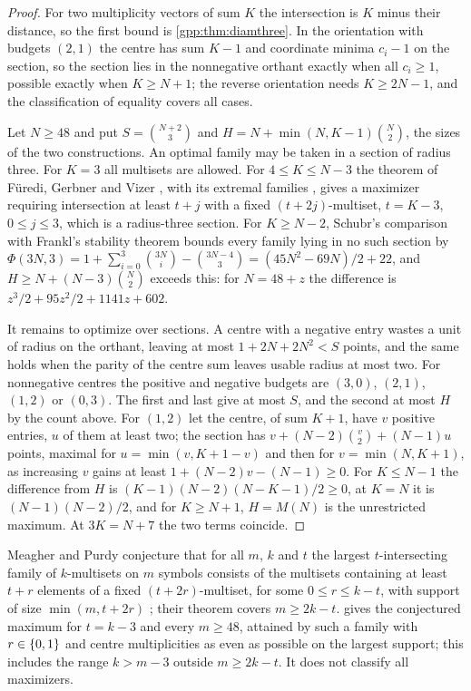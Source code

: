\begin{proof}
For two multiplicity vectors of sum $K$ the intersection is $K$ minus their distance, so the
first bound is \cref{gpp:thm:diamthree}. In the orientation with budgets $(2,1)$ the
centre has sum $K-1$ and coordinate minima $c_i-1$ on the section, so the section lies in
the nonnegative orthant exactly when all $c_i\ge1$, possible exactly when $K\ge N+1$; the
reverse orientation needs $K\ge2N-1$, and the classification of equality covers all cases.

Let $N\ge48$ and put $S=\binom{N+2}3$ and $H=N+\min(N,K-1)\binom N2$, the sizes of the two
constructions. An optimal family may be taken in a section of radius three. For $K=3$ all
multisets are allowed. For $4\le K\le N-3$ the theorem of F\"uredi, Gerbner and Vizer
\cite[Theorem~1.8]{FurediGerbnerVizer2015Discrete}, with its extremal families
\cite[Theorem~1.4 and the display after it]{MeagherPurdy2016Intersection}, gives a maximizer
requiring intersection at least $t+j$ with a fixed $(t+2j)$-multiset, $t=K-3$,
$0\le j\le3$, which is a radius-three section. For $K\ge N-2$, Schubr's comparison with
Frankl's stability theorem \cite[Proposition~3.5]{Schubr2026Maximum} bounds every family
lying in no such section by
$\Phi(3N,3)=1+\sum_{i=0}^3\binom{3N}i-\binom{3N-4}3=(45N^2-69N)/2+22$, and
$H\ge N+(N-3)\binom N2$ exceeds this: for $N=48+z$ the difference is
$z^3/2+95z^2/2+1141z+602$.

It remains to optimize over sections. A centre with a negative entry wastes a unit of
radius on the orthant, leaving at most $1+2N+2N^2<S$ points, and the same holds when the
parity of the centre sum leaves usable radius at most two. For nonnegative centres the
positive and negative budgets are $(3,0)$, $(2,1)$, $(1,2)$ or $(0,3)$. The first and last
give at most $S$, and the second at most $H$ by the count above. For $(1,2)$ let the centre,
of sum $K+1$, have $v$ positive entries, $u$ of them at least two; the section has
$v+(N-2)\binom v2+(N-1)u$ points, maximal for $u=\min(v,K+1-v)$ and then for
$v=\min(N,K+1)$, as increasing $v$ gains at least $1+(N-2)v-(N-1)\ge0$. For $K\le N-1$ the
difference from $H$ is $(K-1)(N-2)(N-K-1)/2\ge0$, at $K=N$ it is $(N-1)(N-2)/2$, and for
$K\ge N+1$, $H=M(N)$ is the unrestricted maximum. At $3K=N+7$ the two terms coincide.
\end{proof}

Meagher and Purdy conjecture that for all $m$, $k$ and $t$ the largest $t$-intersecting
family of $k$-multisets on $m$ symbols consists of the multisets containing at least $t+r$
elements of a fixed $(t+2r)$-multiset, for some $0\le r\le k-t$, with support of size
$\min(m,t+2r)$ \cite[Section~5]{MeagherPurdy2016Intersection}; their theorem covers
$m\ge2k-t$.  gives the conjectured maximum for $t=k-3$ and every
$m\ge48$, attained by such a family with $r\in\{0,1\}$ and centre multiplicities as even as
possible on the largest support; this includes the range $k>m-3$ outside $m\ge2k-t$. It
does not classify all maximizers.

